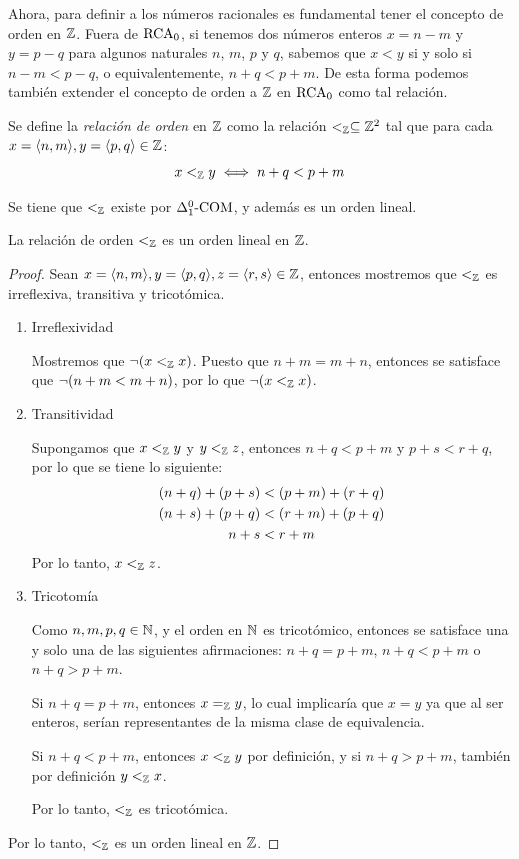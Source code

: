 Ahora, para definir a los números racionales es fundamental tener el concepto de orden en $\ZZ$. Fuera de $\RCA$, si tenemos dos números enteros $x = n - m$ y $y = p - q$ para algunos naturales $n$, $m$, $p$ y $q$, sabemos que $x < y$ si y solo si $n - m < p - q$, o equivalentemente, $n + q < p + m$. De esta forma podemos también extender el concepto de orden a $\ZZ$ en $\RCA$ como tal relación.

\begin{definition}[Orden en $\ZZ$]
	Se define la \emph{relación de orden} en $\ZZ$ como la relación $<_{\ZZ}\subseteq\ZZ^{2}$ tal que para cada $x =\inner*{n, m}, y =\inner*{p, q}\in\ZZ$:
	\[
		x <_{\ZZ} y\iff n + q < p + m
	\]
\end{definition}

Se tiene que $<_{\ZZ}$ existe por $\COMPRENSION{\Delta_{1}^{0}}$, y además es un orden lineal.

\begin{theorem}
	La relación de orden $<_{\ZZ}$ es un orden lineal en $\ZZ$.
\end{theorem}

\begin{proof}
	Sean $x =\inner*{n, m}, y =\inner*{p, q}, z =\inner*{r, s}\in\ZZ$, entonces mostremos que $<_{\ZZ}$ es irreflexiva, transitiva y tricotómica.

	\begin{enumerate}
		\item Irreflexividad

		Mostremos que $\neg\pa*{x <_{\ZZ} x}$. Puesto que $n + m = m + n$, entonces se satisface que $\neg\pa*{n + m < m + n}$, por lo que $\neg\pa*{x <_{\ZZ} x}$.

		\item Transitividad

		Supongamos que $x <_{\ZZ} y$ y $y <_{\ZZ} z$, entonces $n + q < p + m$ y $p + s < r + q$, por lo que se tiene lo siguiente:
		\begin{align*}
			\pa*{n + q} +\pa*{p + s} &<\pa*{p + m} +\pa*{r + q}\\
			\pa*{n + s} +\pa*{p + q} &<\pa*{r + m} +\pa*{p + q}\\
			n + s &< r + m
		\end{align*}
		Por lo tanto, $x <_{\ZZ} z$.

		\item Tricotomía

		Como $n, m, p, q\in\NN$, y el orden en $\NN$ es tricotómico, entonces se satisface una y solo una de las siguientes afirmaciones: $n + q = p + m$, $n + q < p + m$ o $n + q > p + m$.

		Si $n + q = p + m$, entonces $x =_{\ZZ} y$, lo cual implicaría que $x = y$ ya que al ser enteros, serían representantes de la misma clase de equivalencia.

		Si $n + q < p + m$, entonces $x <_{\ZZ} y$ por definición, y si $n + q > p + m$, también por definición $y <_{\ZZ} x$.

		Por lo tanto, $<_{\ZZ}$ es tricotómica.
	\end{enumerate}

	Por lo tanto, $<_{\ZZ}$ es un orden lineal en $\ZZ$.
\end{proof}

